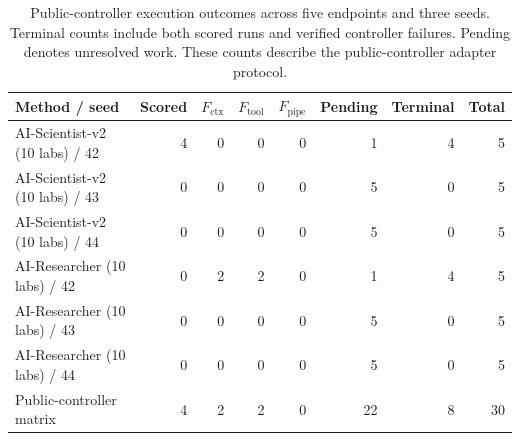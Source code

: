 \begin{table}[t]
\centering\footnotesize
\setlength{\tabcolsep}{3pt}
\begin{tabularx}{\linewidth}{@{}Xrrrrrrr@{}}
\toprule
Method / seed & Scored & $F_{\mathrm{ctx}}$ & $F_{\mathrm{tool}}$ & $F_{\mathrm{pipe}}$ & Pending & Terminal & Total \\
\midrule
AI-Scientist-v2 (10 labs) / 42 & 4 & 0 & 0 & 0 & 1 & 4 & 5 \\
AI-Scientist-v2 (10 labs) / 43 & 0 & 0 & 0 & 0 & 5 & 0 & 5 \\
AI-Scientist-v2 (10 labs) / 44 & 0 & 0 & 0 & 0 & 5 & 0 & 5 \\
\midrule
AI-Researcher (10 labs) / 42 & 0 & 2 & 2 & 0 & 1 & 4 & 5 \\
AI-Researcher (10 labs) / 43 & 0 & 0 & 0 & 0 & 5 & 0 & 5 \\
AI-Researcher (10 labs) / 44 & 0 & 0 & 0 & 0 & 5 & 0 & 5 \\
\midrule
Public-controller matrix & 4 & 2 & 2 & 0 & 22 & 8 & 30 \\
\bottomrule
\end{tabularx}
\caption{Public-controller execution outcomes across five endpoints and three seeds. Terminal counts include both scored runs and verified controller failures. Pending denotes unresolved work. These counts describe the public-controller adapter protocol.}
\label{tab:public-harness-completion}
\end{table}
